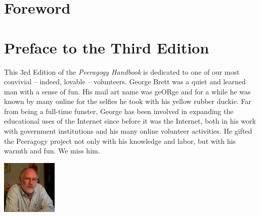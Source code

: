 \documentclass[ebook, 12pt, twoside]{memoir}
\let\sc\scshape
\let\sc\scshape
\begin{document}

\clearpage
\chapter*{Foreword}
\pagestyle{companion}
\markboth{{\sc Foreword}}{{\sc Foreword}}
%


\newpage
\chapter*{Preface to the Third Edition}

This 3rd Edition of the \emph{Peeragogy Handbook} is dedicated to one
of our most convivial -- indeed, lovable -- volunteers. George Brett
was a quiet and learned man with a sense of fun.  His mail art name
was geORge and for a while he was known by many online for the selfies
he took with his yellow rubber duckie. Far from being a full-time
funster, George has been involved in expanding the educational uses of
the Internet since before it was the Internet, both in his work with
government institutions and his many online volunteer activities. He
gifted the Peeragogy project not only with his knowledge and labor,
but with his warmth and fun.  We miss him.

\begin{center}
 \includegraphics[width=.8\textwidth]{../pictures/george.jpg}
\end{center}
\end{document}

